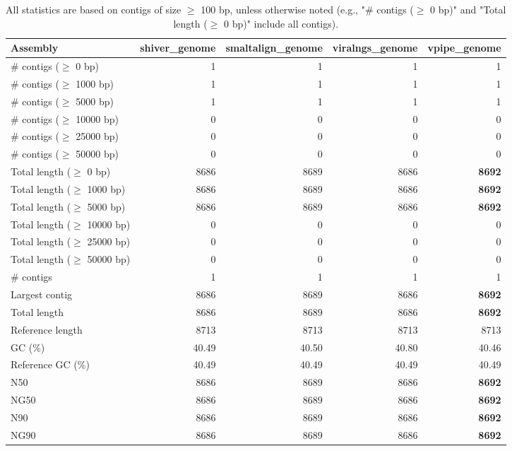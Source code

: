 \documentclass[12pt,a4paper]{article}
\begin{document}
\begin{table}[ht]
\begin{center}
\caption{All statistics are based on contigs of size $\geq$ 100 bp, unless otherwise noted (e.g., "\# contigs ($\geq$ 0 bp)" and "Total length ($\geq$ 0 bp)" include all contigs).}
\begin{tabular}{|l*{4}{|r}|}
\hline
Assembly & shiver\_genome & smaltalign\_genome & viralngs\_genome & vpipe\_genome \\ \hline
\# contigs ($\geq$ 0 bp) & 1 & 1 & 1 & 1 \\ \hline
\# contigs ($\geq$ 1000 bp) & 1 & 1 & 1 & 1 \\ \hline
\# contigs ($\geq$ 5000 bp) & 1 & 1 & 1 & 1 \\ \hline
\# contigs ($\geq$ 10000 bp) & 0 & 0 & 0 & 0 \\ \hline
\# contigs ($\geq$ 25000 bp) & 0 & 0 & 0 & 0 \\ \hline
\# contigs ($\geq$ 50000 bp) & 0 & 0 & 0 & 0 \\ \hline
Total length ($\geq$ 0 bp) & 8686 & 8689 & 8686 & {\bf 8692} \\ \hline
Total length ($\geq$ 1000 bp) & 8686 & 8689 & 8686 & {\bf 8692} \\ \hline
Total length ($\geq$ 5000 bp) & 8686 & 8689 & 8686 & {\bf 8692} \\ \hline
Total length ($\geq$ 10000 bp) & 0 & 0 & 0 & 0 \\ \hline
Total length ($\geq$ 25000 bp) & 0 & 0 & 0 & 0 \\ \hline
Total length ($\geq$ 50000 bp) & 0 & 0 & 0 & 0 \\ \hline
\# contigs & 1 & 1 & 1 & 1 \\ \hline
Largest contig & 8686 & 8689 & 8686 & {\bf 8692} \\ \hline
Total length & 8686 & 8689 & 8686 & {\bf 8692} \\ \hline
Reference length & 8713 & 8713 & 8713 & 8713 \\ \hline
GC (\%) & 40.49 & 40.50 & 40.80 & 40.46 \\ \hline
Reference GC (\%) & 40.49 & 40.49 & 40.49 & 40.49 \\ \hline
N50 & 8686 & 8689 & 8686 & {\bf 8692} \\ \hline
NG50 & 8686 & 8689 & 8686 & {\bf 8692} \\ \hline
N90 & 8686 & 8689 & 8686 & {\bf 8692} \\ \hline
NG90 & 8686 & 8689 & 8686 & {\bf 8692} \\ \hline

\end{tabular}
\end{center}
\end{table}
\end{document}
